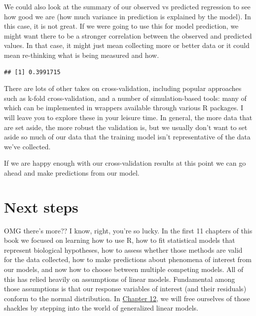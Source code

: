 \documentclass[
]{book}
\newenvironment{Shaded}{\begin{snugshade}}{\end{snugshade}}
\newcommand{\CommentTok}[1]{\textcolor[rgb]{0.56,0.35,0.01}{\textit{#1}}}
\newcommand{\KeywordTok}[1]{\textcolor[rgb]{0.13,0.29,0.53}{\textbf{#1}}}
\newcommand{\NormalTok}[1]{#1}
\newcommand{\OperatorTok}[1]{\textcolor[rgb]{0.81,0.36,0.00}{\textbf{#1}}}
\begin{document}
We could also look at the summary of our observed vs predicted regression to see how good we are (how much variance in prediction is explained by the model). In this case, it is not great. If we were going to use this for model prediction, we might want there to be a stronger correlation between the observed and predicted values. In that case, it might just mean collecting more or better data or it could mean re-thinking what is being measured and how.

\begin{Shaded}
\end{Shaded}

\begin{verbatim}
## [1] 0.3991715
\end{verbatim}

There are lots of other takes on cross-validation, including popular approaches such as k-fold cross-validation, and a number of simulation-based tools: many of which can be implemented in wrappers available through various R packages. I will leave you to explore these in your leisure time. In general, the more data that are set aside, the more robust the validation is, but we usually don't want to set aside so much of our data that the training model isn't representative of the data we've collected.

If we are happy enough with our cross-validation results at this point we can go ahead and make predictions from our model.

\hypertarget{next11}{%
\section{Next steps}\label{next11}}

OMG there's more?? I know, right, you're so lucky. In the first 11 chapters of this book we focused on learning how to use R, how to fit statistical models that represent biological hypotheses, how to assess whether those methods are valid for the data collected, how to make predictions about phenomena of interest from our models, and now how to choose between multiple competing models. All of this has relied heavily on assumptions of linear models. Fundamental among those assumptions is that our response variables of interest (and their residuals) conform to the normal distribution. In \protect\hyperlink{Chapter12}{Chapter 12}, we will free ourselves of those shackles by stepping into the world of generalized linear models.
\end{document}
